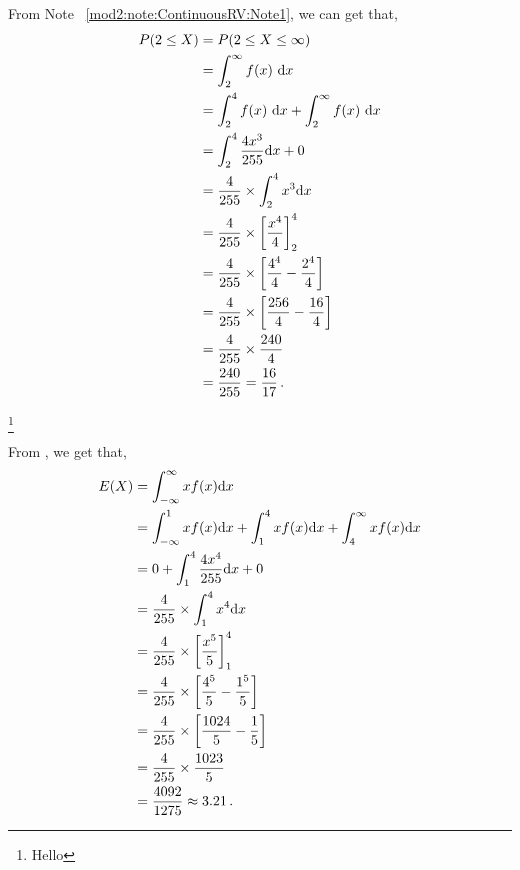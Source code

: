 \begin{subquestions}
\begin{subsubquestions}
From Note ~\ref{mod2:note:ContinuousRV:Note1}, we can get that,
\begin{align}
	P(2 \leq X) &= P(2\leq X \leq \infty) \nonumber \\
	                                 & = \int_2^{\infty} f(x)~\mathrm{d}x \nonumber \\
	                                 & = \int_2^{4} f(x)~\mathrm{d}x+\int_2^{\infty} f(x)~\mathrm{d}x \nonumber \\
	                                 & = \int_{2}^{4} \frac{4x^3}{255} \mathrm{d}x + 0 \nonumber \\
	                                 & = \frac{4}{255} \times \int_2^4 x^3\mathrm{d}x \nonumber \\
	                                 & = \frac{4}{255} \times \left[\frac{x^4}{4}\right]^4_2 \nonumber \\
	                                 & = \frac{4}{255} \times \left[\frac{4^4}{4}-\frac{2^4}{4}\right] \nonumber \\
	                                 & = \frac{4}{255} \times \left[\frac{256}{4}-\frac{16}{4}\right] \nonumber \\
	                                 & = \frac{4}{255} \times \frac{240}{4} \nonumber \\
	                                 & = \frac{240}{255} = \frac{16}{17} \,.
\end{align}
	
\footnote{Hello}

\subsubquestion

From , we get that,
\begin{align}
	E(X) & = \int_{-\infty}^{\infty} x f(x)\mathrm{d}x \nonumber \\
		 & = \int_{-\infty}^{1}xf(x)\mathrm{d}x + \int_{1}^{4} xf(x)\mathrm{d}x + \int_{4}^{\infty} xf(x)\mathrm{d}x \nonumber \\
		 & = 0 + \int_{1}^{4} \frac{4x^4}{255} \mathrm{d}x + 0 \nonumber \\
	     & = \frac{4}{255} \times \int_{1}^{4} x^4 \mathrm{d}x \nonumber \\
	     & = \frac{4}{255} \times \left[\frac{x^5}{5}\right]^4_1 \nonumber \\
	     & = \frac{4}{255} \times \left[\frac{4^5}{5} - \frac{1^5}{5}\right] \nonumber \\
	     & = \frac{4}{255} \times \left[\frac{1024}{5} - \frac{1}{5}\right] \nonumber \\
	     & = \frac{4}{255} \times \frac{1023}{5} \nonumber \\
	     & = \frac{4092}{1275} \approx 3.21 \,. 
\end{align}


\end{subsubquestions}
\end{subquestions}
